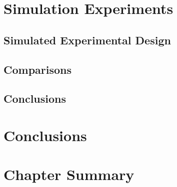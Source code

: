 \section{Simulation Experiments}
\subsection{Simulated Experimental Design}
\subsection{Comparisons}
\subsection{Conclusions}

\section{Conclusions}
\section{Chapter Summary}
